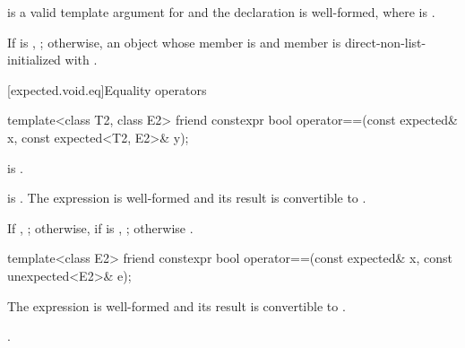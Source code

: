 \begin{itemdescr}
\pnum
\mandates
{} is a valid template argument for  and the declaration  is well-formed, where  is .

\pnum
\returns
If  is , ; otherwise, an  object whose  member is  and  member is direct-non-list-initialized with .
\end{itemdescr}

[expected.void.eq]{Equality operators}

%
\begin{itemdecl}
template<class T2, class E2>
  friend constexpr bool operator==(const expected& x, const expected<T2, E2>& y);
\end{itemdecl}

\begin{itemdescr}
\pnum
\constraints
{} is .

\pnum
\mandates
{} is . The expression  is well-formed and its result is convertible to .

\pnum
\returns
If , ; otherwise, if  is , ; otherwise .
\end{itemdescr}

%
\begin{itemdecl}
template<class E2>
  friend constexpr bool operator==(const expected& x, const unexpected<E2>& e);
\end{itemdecl}

\begin{itemdescr}
\pnum
\mandates
The expression  is well-formed and its result is convertible to .

\pnum
\returns
{}.
\end{itemdescr}
